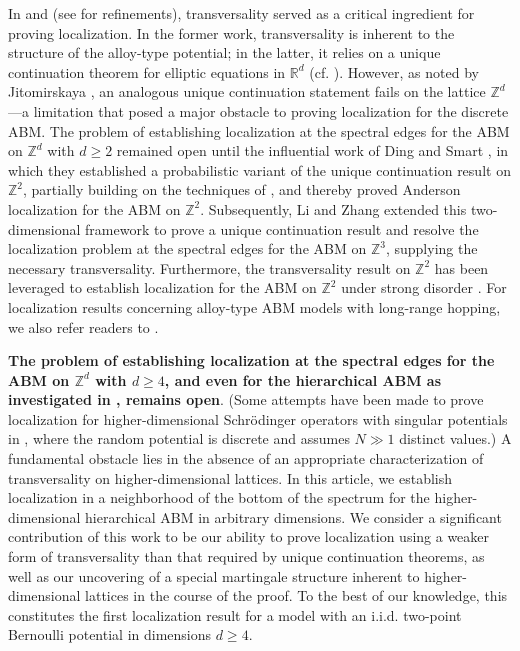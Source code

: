 \documentclass[11pt,reqno,UTF8,twoside]{amsart}
\newcommand{\Z}{\mathbb{Z}}
\newcommand{\R}{\mathbb{R}}
\theoremstyle{definition}
\numberwithin{equation}{section}
\begin{document}
In \cite{Bou04} and \cite{BK05} (see \cite{GK13} for refinements), transversality served as a critical ingredient for proving localization. In the former work, transversality is inherent to the structure of the alloy-type potential; in the latter, it relies on a unique continuation theorem for elliptic equations in $\R^d$ (cf. \cite[Lemma 3.15]{BK05}). However, as noted by Jitomirskaya \cite{Jit07}, an analogous unique continuation statement fails on the lattice  $\Z^d$—a limitation that posed a major obstacle to proving localization for the discrete ABM. The problem of establishing localization at the spectral edges for the ABM on  $\Z^d$ with $d\ge 2$
remained open until the influential work of Ding and Smart \cite{DS20}, in which they established a probabilistic variant of the unique continuation result on $\Z^2$, partially building on the techniques of \cite{BLMS}, and thereby proved Anderson localization for the ABM on $\Z^2$. Subsequently, Li and Zhang \cite{LZ22} extended this two-dimensional framework to prove a unique continuation result and resolve the localization problem at the spectral edges for the ABM on $\Z^3$, supplying the necessary transversality. Furthermore, the transversality result on $\Z^2$ has been leveraged to establish localization for the ABM on $\Z^2$
under strong disorder \cite{Li22}. For localization results concerning alloy-type ABM models with long-range hopping, we also refer readers to \cite{LSZ25}.


{\bf The problem of establishing localization at the spectral edges for the ABM on $\Z^d$ with $d\geq 4$, and even for the hierarchical ABM as investigated in \cite{JLMS85}, remains open}. (Some attempts have been made to prove localization for higher-dimensional Schrödinger operators with singular potentials in \cite{Imb21}, where the random potential is discrete and assumes $N\gg1$ distinct values.)   A fundamental obstacle lies in the absence of an appropriate characterization of transversality on higher-dimensional lattices. In this article, we establish localization in a neighborhood of the bottom of the spectrum for the higher-dimensional hierarchical ABM in arbitrary dimensions. We consider a significant contribution of this work to be our ability to prove localization using a weaker form of transversality than that required by unique continuation theorems, as well as our uncovering of a { special martingale structure} inherent to higher-dimensional lattices in the course of the proof. To the best of our knowledge, this constitutes the first localization result for a model with an i.i.d. two-point Bernoulli potential in dimensions $d\geq 4$.
\end{document}
